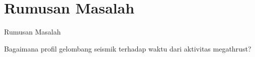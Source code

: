 \section{Rumusan Masalah}
\begin{frame}{Rumusan Masalah}
    \begin{tcolorbox}[enhanced,title=Rumusan Masalah, frame style tile={width=\paperwidth}{\wallpaper}]
        Bagaimana profil gelombang seismik terhadap 
        waktu dari aktivitas megathrust?
    \end{tcolorbox}
\end{frame}